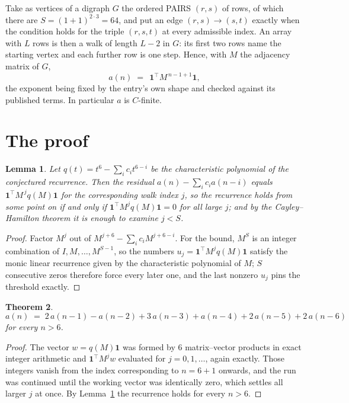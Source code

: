\documentclass[11pt,a4paper]{article}
\theoremstyle{plain}
\newtheorem{theorem}{Theorem}
\newtheorem{lemma}[theorem]{Lemma}
\theoremstyle{definition}
\begin{document}
Take as vertices of a digraph $G$ the ordered PAIRS $(r,s)$ of rows, of which there are
$S=(1+1)^{2\cdot3}=64$, and put an edge $(r,s)\to(s,t)$ exactly when the condition
holds for the triple $(r,s,t)$ at every admissible index. An array with $L$ rows is then a
walk of length $L-2$ in $G$: its first two rows name the starting vertex and each further
row is one step. Hence, with $M$ the adjacency matrix of $G$,
\[
a(n)\;=\;\,\mathbf{1}^{\!\top}M^{\,n-1+1}\mathbf{1},
\]
the exponent being fixed by the entry's own shape and checked against its published terms.
In particular $a$ is $C$-finite.

\section{The proof}

\begin{lemma}\label{lem:crit}
Let $q(t)=t^{6}-\sum_i c_it^{6-i}$ be the characteristic polynomial of the
conjectured recurrence. Then the residual $a(n)-\sum_ic_ia(n-i)$ equals
$\mathbf{1}^{\!\top}M^{\,j}q(M)\mathbf{1}$ for the corresponding walk index
$j$, so the recurrence holds from some point on if and only if
$\mathbf{1}^{\!\top}M^{j}q(M)\mathbf{1}=0$ for all large $j$; and by the
Cayley--Hamilton theorem it is enough to examine $j<S$.
\end{lemma}

\begin{proof}
Factor $M^{j}$ out of $M^{j+6}-\sum_ic_iM^{j+6-i}$. For the bound, $M^{S}$
is an integer combination of $I,M,\dots,M^{S-1}$, so the numbers
$u_j=\mathbf{1}^{\!\top}M^{j}q(M)\mathbf{1}$ satisfy the monic linear recurrence given by
the characteristic polynomial of $M$; $S$ consecutive zeros therefore force every later one,
and the last nonzero $u_j$ pins the threshold exactly.
\end{proof}

\begin{theorem}
\[
a(n)\;=\;2\,a(n-1) - a(n-2) + 3\,a(n-3) + a(n-4) + 2\,a(n-5) + 2\,a(n-6)
\]
for every $n>6$.
\end{theorem}

\begin{proof}
The vector $w=q(M)\mathbf{1}$ was formed by $6$ matrix--vector products in exact
integer arithmetic and $\mathbf{1}^{\!\top}M^{j}w$ evaluated for $j=0,1,\dots$, again
exactly. Those integers vanish from the index corresponding to $n=6+1$ onwards, and the
run was continued until the working vector was identically zero, which settles all larger $j$
at once. By Lemma~\ref{lem:crit} the recurrence holds for every $n>6$.
\end{proof}
\end{document}
